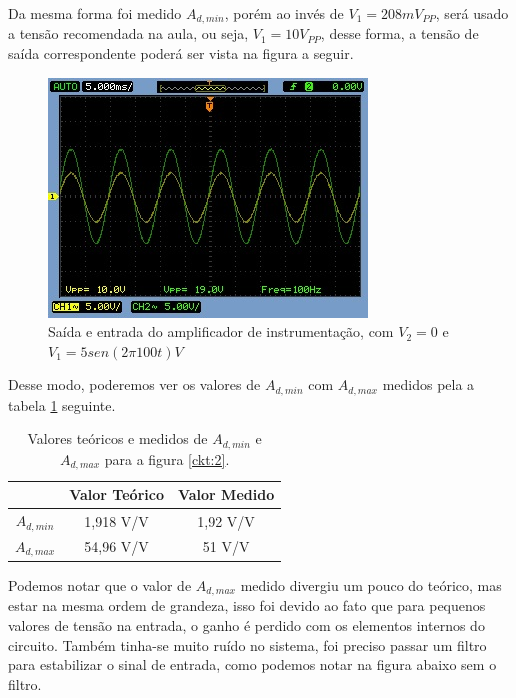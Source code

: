 Da mesma forma foi medido $A_{d,min}$, porém ao invés de $V_1= 208mV_{PP}$, será usado a tensão recomendada na aula, ou seja, $V_1= 10V_{PP}$, desse forma, a tensão de saída correspondente poderá ser vista na figura a seguir.

\begin{figure}[H] 
\centering
\includegraphics[scale=0.7]{imagens/AD2MIN.jpg} 
\caption{Saída e entrada do amplificador de instrumentação, com $V_2=0$ e $V_1=5sen(2\pi100t)V$}
\label{p3-out} 
\end{figure}


Desse modo, poderemos ver os valores de $A_{d,min}$ com $A_{d,max}$ medidos pela a tabela \ref{tab:5} seguinte.

\begin{table}[H]
\centering
\begin{tabular}{c|c|c|}
\cline{2-3}
\textbf{} & \textbf{Valor Teórico} & \textbf{Valor Medido} \\ \hline
\multicolumn{1}{|c|}{\textbf{$A_{d,min}$}} & 1,918 V/V & 1,92 V/V \\ \hline
\multicolumn{1}{|c|}{\textbf{$A_{d, max}$}} & 54,96 V/V & 51 V/V \\ \hline
\end{tabular}
\caption{Valores teóricos e medidos de $A_{d,min}$ e $A_{d,max}$  para a figura \ref{ckt:2}.}
\label{tab:5}
\end{table}

Podemos notar que o valor de $A_{d,max}$ medido divergiu um pouco do teórico, mas estar na mesma ordem de grandeza, isso foi devido ao fato que para pequenos valores de tensão na entrada, o ganho é perdido com os elementos internos do circuito. Também tinha-se muito ruído no sistema, foi preciso passar um filtro para estabilizar o sinal de entrada, como podemos notar na figura abaixo sem o filtro.

